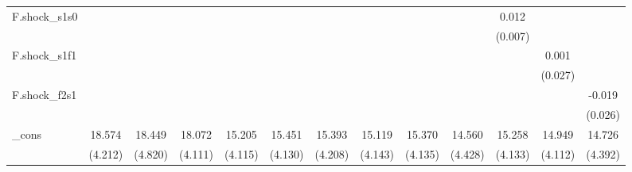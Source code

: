 {\begin{tabular}{l*{12}{c}}
\addlinespace
F.shock\_s1s0&                     &                     &                     &                     &                     &                     &                     &                     &                     &       0.012\sym{*}  &                     &                     \\
            &                     &                     &                     &                     &                     &                     &                     &                     &                     &     (0.007)         &                     &                     \\
\addlinespace
F.shock\_s1f1&                     &                     &                     &                     &                     &                     &                     &                     &                     &                     &       0.001         &                     \\
            &                     &                     &                     &                     &                     &                     &                     &                     &                     &                     &     (0.027)         &                     \\
\addlinespace
F.shock\_f2s1&                     &                     &                     &                     &                     &                     &                     &                     &                     &                     &                     &      -0.019         \\
            &                     &                     &                     &                     &                     &                     &                     &                     &                     &                     &                     &     (0.026)         \\
\addlinespace
\_cons      &      18.574\sym{***}&      18.449\sym{***}&      18.072\sym{***}&      15.205\sym{***}&      15.451\sym{***}&      15.393\sym{***}&      15.119\sym{***}&      15.370\sym{***}&      14.560\sym{***}&      15.258\sym{***}&      14.949\sym{***}&      14.726\sym{***}\\
            &     (4.212)         &     (4.820)         &     (4.111)         &     (4.115)         &     (4.130)         &     (4.208)         &     (4.143)         &     (4.135)         &     (4.428)         &     (4.133)         &     (4.112)         &     (4.392)         \\

\end{tabular}}
